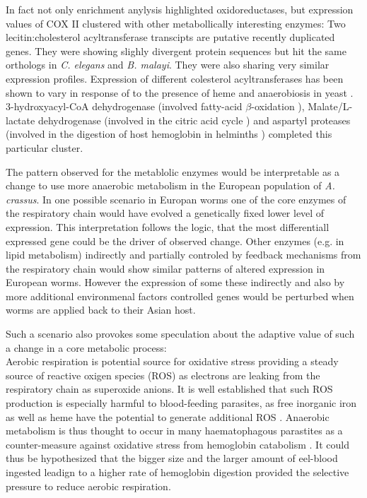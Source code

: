 In fact not only enrichment anylysis highlighted oxidoreductases, but
expression values of COX II clustered with other metabollically
interesting enzymes: Two lecitin:cholesterol acyltransferase
transcipts are putative recently duplicated genes. They were showing
slighly divergent protein sequences but hit the same orthologs in
\textit{C. elegans} and \textit{B. malayi}. They were also sharing
very similar expression profiles. Expression of different colesterol
acyltransferases has been shown to vary in response of to the presence
of heme and anaerobiosis in yeast
\cite{pmid11786267}. 3-hydroxyacyl-CoA dehydrogenase (involved
fatty-acid $\beta$-oxidation \cite{pmid8454629}), Malate/L-lactate
dehydrogenase (involved in the citric acid cycle
\cite{sturm1969vergleichende}) and aspartyl proteases (involved in the
digestion of host hemoglobin in helminths \cite{pmid12782060})
completed this particular cluster.

The pattern observed for the metablolic enzymes would be interpretable
as a change to use more anaerobic metabolism in the European
population of \textit{A. crassus}. In one possible scenario in Europan
worms one of the core enzymes of the respiratory chain would have
evolved a genetically fixed lower level of expression. This
interpretation follows the logic, that the most differentiall
expressed gene could be the driver of observed change. Other enzymes
(e.g. in lipid metabolism) indirectly and partially controled by
feedback mechanisms from the respiratory chain would show similar
patterns of altered expression in European worms. However the
expression of some these indirectly and also by more additional
environmenal factors controlled genes would be perturbed when worms
are applied back to their Asian host.


Such a scenario also provokes some speculation about the adaptive
value of such a change in a core metabolic process:\\
Aerobic respiration is potential source for oxidative stress providing
a steady source of reactive oxigen species (ROS) as electrons are
leaking from the respiratory chain as superoxide anions. It is well
established that such ROS production is especially harmful to
blood-feeding parasites, as free inorganic iron as well as heme have
the potential to generate additional ROS
\cite{pmid21087517}. Anaerobic metabolism is thus thought to occur in
many haematophagous parastites as a counter-measure against oxidative
stress from hemoglobin catabolism \cite{pmid12163151}. It could thus
be hypothesized that the bigger size and the larger amount of
eel-blood ingested leadign to a higher rate of hemoglobin digestion
provided the selective pressure to reduce aerobic respiration.

